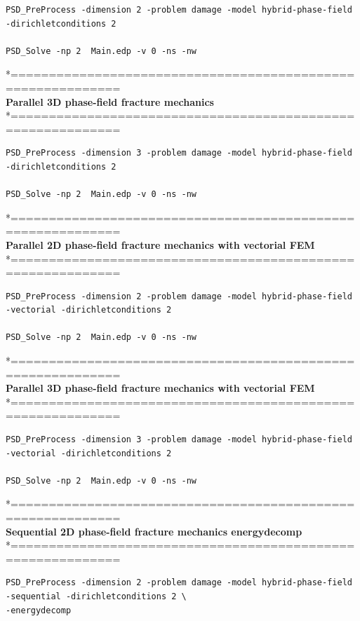 {{\begin{lstlisting}[style=BashInputStyle]
PSD_PreProcess -dimension 2 -problem damage -model hybrid-phase-field -dirichletconditions 2   

PSD_Solve -np 2  Main.edp -v 0 -ns -nw   
\end{lstlisting}
*============================================================\\
\textbf{ Parallel 3D phase-field fracture mechanics} \\
*============================================================\\
\begin{lstlisting}[style=BashInputStyle]
PSD_PreProcess -dimension 3 -problem damage -model hybrid-phase-field -dirichletconditions 2   

PSD_Solve -np 2  Main.edp -v 0 -ns -nw   
\end{lstlisting}
*============================================================\\
\textbf{ Parallel 2D phase-field fracture mechanics with vectorial FEM } \\
*============================================================\\

\begin{lstlisting}[style=BashInputStyle]
PSD_PreProcess -dimension 2 -problem damage -model hybrid-phase-field -vectorial -dirichletconditions 2   

PSD_Solve -np 2  Main.edp -v 0 -ns -nw   
\end{lstlisting}
*============================================================\\
\textbf{ Parallel 3D phase-field fracture mechanics  with vectorial FEM} \\
*============================================================\\
\begin{lstlisting}[style=BashInputStyle]
PSD_PreProcess -dimension 3 -problem damage -model hybrid-phase-field -vectorial -dirichletconditions 2   

PSD_Solve -np 2  Main.edp -v 0 -ns -nw   
\end{lstlisting}
*============================================================\\
\textbf{ Sequential 2D  phase-field fracture mechanics energydecomp }\\
*============================================================\\
\begin{lstlisting}[style=BashInputStyle]
PSD_PreProcess -dimension 2 -problem damage -model hybrid-phase-field -sequential -dirichletconditions 2 \
-energydecomp   


\end{lstlisting}}}
